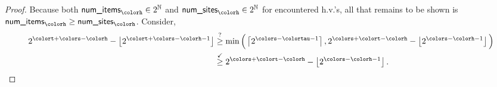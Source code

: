 \begin{proof}
Because both $\textsf{num\_items}_{\colorh} \in 2^{\mathbb{N}}$ and $\textsf{num\_sites}_{\colorh} \in 2^{\mathbb{N}}$ for encountered h.v.'s, all that remains to be shown is $\textsf{num\_items}_{\colorh} \geq \textsf{num\_sites}_{\colorh}$.
Consider,
\begin{align*}
2^{\colort + \colors - \colorh} - \left\lfloor2^{\colort + \colors - \colorh - 1} \right\rfloor
&\stackrel{?}{\geq}
\min\Big(
\left\lceil 2^{\colors - \colortau - 1} \right\rceil,
2^{\colors + \colort - \colorh} - \left\lfloor 2^{\colors - \colorh - 1} \right\rfloor
\Big)\\
&\stackrel{\checkmark}{\geq}
2^{\colors + \colort - \colorh} - \left\lfloor 2^{\colors - \colorh - 1} \right\rfloor.
\end{align*}
\end{proof}
